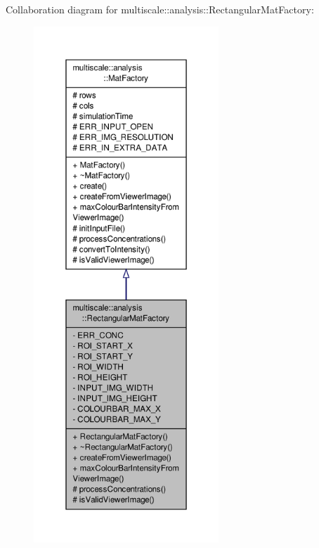 Collaboration diagram for multiscale\-:\-:analysis\-:\-:Rectangular\-Mat\-Factory\-:
\nopagebreak
\begin{figure}[H]
\begin{center}
\leavevmode
\includegraphics[height=550pt]{classmultiscale_1_1analysis_1_1RectangularMatFactory__coll__graph}
\end{center}
\end{figure}
